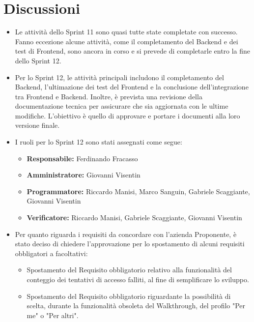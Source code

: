 \documentclass[a4paper,12pt]{article}
\begin{document}
\section{Discussioni}
\begin{itemize}
    \item Le attività dello Sprint 11 sono quasi tutte state completate con successo. Fanno eccezione alcune attività, come il completamento del Backend e dei test di Frontend, sono ancora in corso e si prevede di completarle entro la fine dello Sprint 12.
    \item Per lo Sprint 12, le attività principali includono il completamento del Backend, l'ultimazione dei test del Frontend e la conclusione dell'integrazione tra Frontend e Backend. Inoltre, è prevista una revisione della documentazione tecnica per assicurare che sia aggiornata con le ultime modifiche. L'obiettivo è quello di approvare e portare i documenti alla loro versione finale.
    \item I ruoli per lo Sprint 12 sono stati assegnati come segue:
    \begin{itemize}
        \item \textbf{Responsabile:} Ferdinando Fracasso
        \item \textbf{Amministratore:} Giovanni Visentin
        \item \textbf{Programmatore:} Riccardo Manisi, Marco Sanguin, Gabriele Scaggiante, Giovanni Visentin
        \item \textbf{Verificatore:} Riccardo Manisi, Gabriele Scaggiante, Giovanni Visentin
    \end{itemize}
    \item Per quanto riguarda i requisiti da concordare con l'azienda Proponente, è stato deciso di chiedere l'approvazione per lo spostamento di alcuni requisiti obbligatori a facoltativi:
    \begin{itemize}
        \item Spostamento del Requisito obbligatorio relativo alla funzionalità del conteggio dei tentativi di accesso falliti, al fine di semplificare lo sviluppo.
        \item Spostamento del Requisito obbligatorio riguardante la possibilità di scelta, durante la funzionalità obsoleta del Walkthrough, del profilo "Per me" o "Per altri".
    \end{itemize}
\end{itemize}
\end{document}
